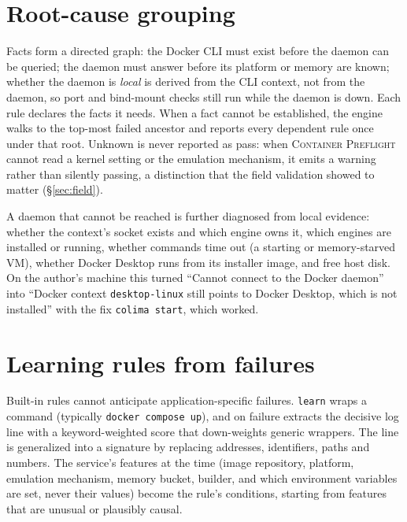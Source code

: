 \documentclass[preprint,12pt]{elsarticle}
\newcommand{\tool}{\textsc{Container Preflight}}
\begin{document}
\section{Root-cause grouping}
\label{sec:causal}

Facts form a directed graph: the Docker CLI must exist before the daemon can be queried; the daemon must answer before its platform or memory are known; whether the daemon is \emph{local} is derived from the CLI context, not from the daemon, so port and bind-mount checks still run while the daemon is down. Each rule declares the facts it needs. When a fact cannot be established, the engine walks to the top-most failed ancestor and reports every dependent rule once under that root. Unknown is never reported as pass: when \tool{} cannot read a kernel setting or the emulation mechanism, it emits a warning rather than silently passing, a distinction that the field validation showed to matter (\S\ref{sec:field}).

A daemon that cannot be reached is further diagnosed from local evidence: whether the context's socket exists and which engine owns it, which engines are installed or running, whether commands time out (a starting or memory-starved VM), whether Docker Desktop runs from its installer image, and free host disk. On the author's machine this turned ``Cannot connect to the Docker daemon'' into ``Docker context \texttt{desktop-linux} still points to Docker Desktop, which is not installed'' with the fix \texttt{colima start}, which worked.

\section{Learning rules from failures}
\label{sec:learn}

Built-in rules cannot anticipate application-specific failures. \texttt{learn} wraps a command (typically \texttt{docker compose up}), and on failure extracts the decisive log line with a keyword-weighted score that down-weights generic wrappers. The line is generalized into a signature by replacing addresses, identifiers, paths and numbers. The service's features at the time (image repository, platform, emulation mechanism, memory bucket, builder, and which environment variables are set, never their values) become the rule's conditions, starting from features that are unusual or plausibly causal.
\end{document}

